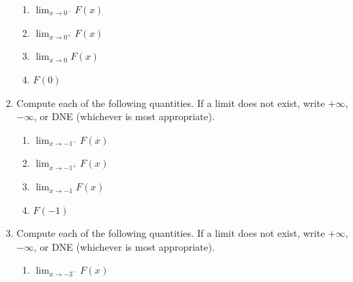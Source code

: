 \documentclass[12pt]{article}
\newif\ifans
\begin{document}
\begin{enumerate}
\begin{enumerate}

\item $\displaystyle \lim_{x \rightarrow 0^{-}}{F(x)}$

\ifans{\fbox{$0$}} \fi

\item $\displaystyle \lim_{x \rightarrow 0^{+}}{F(x)}$

\ifans{\fbox{$0$}} \fi

\item $\displaystyle \lim_{x \rightarrow 0}{F(x)}$

\ifans{\fbox{$0$}} \fi

\item $F(0)$

\ifans{\fbox{$0$}} \fi

\end{enumerate}

\item Compute each of the following quantities.  If a limit does not exist, write $+\infty$, $-\infty$, or DNE (whichever is most appropriate). 

\begin{enumerate}

\item $\displaystyle \lim_{x \rightarrow -1^{-}}{F(x)}$

\ifans{\fbox{$-1$}} \fi

\item $\displaystyle \lim_{x \rightarrow -1^{+}}{F(x)}$

\ifans{\fbox{$-1$}} \fi

\item $\displaystyle \lim_{x \rightarrow -1}{F(x)}$

\ifans{\fbox{$-1$}} \fi

\item $F(-1)$

\ifans{\fbox{$2$}} \fi

\end{enumerate}

\item Compute each of the following quantities.  If a limit does not exist, write $+\infty$, $-\infty$, or DNE (whichever is most appropriate). 

\begin{enumerate}

\item $\displaystyle \lim_{x \rightarrow -3^{-}}{F(x)}$

\ifans{\fbox{$1$}} \fi


\end{enumerate}
\end{enumerate}
\end{document}
